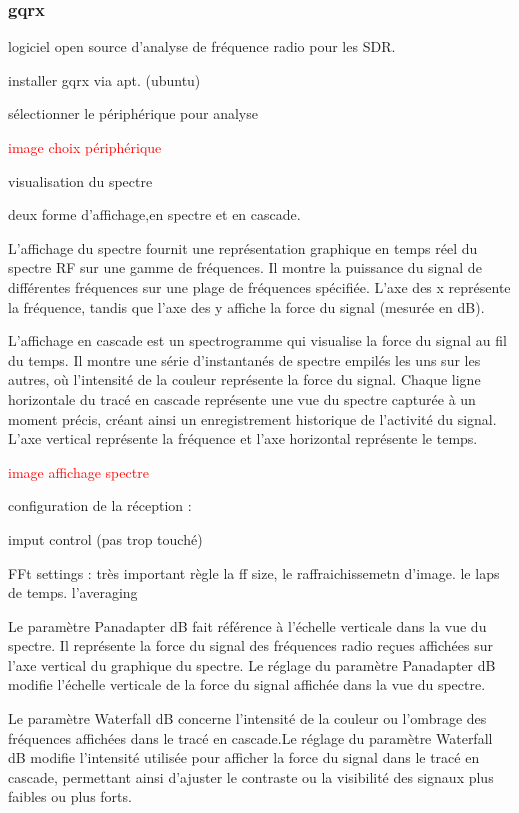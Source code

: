 \documentclass[12pt,a4paper,oneside, titlepage]{report}
\begin{document}
\subsubsection{gqrx}

logiciel open source d'analyse de fréquence radio pour les SDR.

installer gqrx via apt. (ubuntu)

sélectionner le périphérique pour analyse

\textcolor{red}{image choix périphérique}

visualisation du spectre

deux forme d'affichage,en spectre et en cascade.

L'affichage du spectre fournit une représentation graphique en temps réel du spectre RF sur une gamme de fréquences.
Il montre la puissance du signal de différentes fréquences sur une plage de fréquences spécifiée.
L'axe des x représente la fréquence, tandis que l'axe des y affiche la force du signal (mesurée en dB).

L'affichage en cascade est un spectrogramme qui visualise la force du signal au fil du temps.
Il montre une série d'instantanés de spectre empilés les uns sur les autres, où l'intensité de la couleur représente la force du signal.
Chaque ligne horizontale du tracé en cascade représente une vue du spectre capturée à un moment précis, créant ainsi un enregistrement historique de l'activité du signal.
L'axe vertical représente la fréquence et l'axe horizontal représente le temps.

\textcolor{red}{image affichage spectre}

configuration de la réception :

imput control (pas trop touché)

FFt settings : très important règle la ff size, le raffraichissemetn d'image. le laps de temps. l'averaging

Le paramètre Panadapter dB fait référence à l'échelle verticale dans la vue du spectre. Il représente la force du signal des fréquences radio reçues affichées sur l'axe vertical du graphique du spectre. Le réglage du paramètre Panadapter dB modifie l’échelle verticale de la force du signal affichée dans la vue du spectre.

Le paramètre Waterfall dB concerne l'intensité de la couleur ou l'ombrage des fréquences affichées dans le tracé en cascade.Le réglage du paramètre Waterfall dB modifie l'intensité utilisée pour afficher la force du signal dans le tracé en cascade, permettant ainsi d'ajuster le contraste ou la visibilité des signaux plus faibles ou plus forts.
\end{document}
